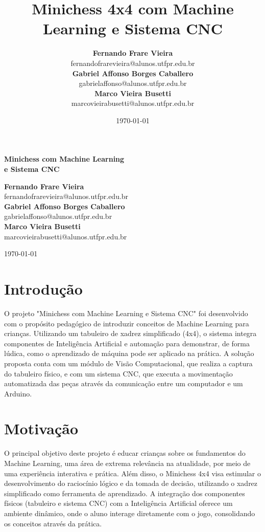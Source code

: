 \documentclass[a4paper,12pt]{article}
\title{\textbf{Minichess 4x4 com Machine Learning e Sistema CNC}}
\author{%
    \textbf{Fernando Frare Vieira} \\
    fernandofrarevieira@alunos.utfpr.edu.br \\[1.5em]
    \textbf{Gabriel Affonso Borges Caballero} \\
    gabrielaffonso@alunos.utfpr.edu.br \\[1.5em]
    \textbf{Marco Vieira Busetti} \\
    marcovieirabusetti@alunos.utfpr.edu.br
}
\date{\today}
\begin{document}
\vspace{1em}

\begin{center}
    \Large\textbf{Minichess com Machine Learning \\e Sistema CNC}
\end{center}

\vspace{1em}

\begin{center}
    \textbf{Fernando Frare Vieira} \\
    fernandofrarevieira@alunos.utfpr.edu.br \\[1.5em]
    \textbf{Gabriel Affonso Borges Caballero} \\
    gabrielaffonso@alunos.utfpr.edu.br \\[1.5em]
    \textbf{Marco Vieira Busetti} \\
    marcovieirabusetti@alunos.utfpr.edu.br
\end{center}

\vspace{2em}

\begin{center}
    \today
\end{center}

\vspace{2em}

\section{Introdução}
O projeto "Minichess com Machine Learning e Sistema CNC" \;foi desenvolvido com o propósito pedagógico de introduzir conceitos de Machine Learning para crianças. Utilizando um tabuleiro de xadrez simplificado (4x4), o sistema integra componentes de Inteligência Artificial e automação para demonstrar, de forma lúdica, como o aprendizado de máquina pode ser aplicado na prática. A solução proposta conta com um módulo de Visão Computacional, que realiza a captura do tabuleiro físico, e com um sistema CNC, que executa a movimentação automatizada das peças através da comunicação entre um computador e um Arduino.

\section{Motivação}
O principal objetivo deste projeto é educar crianças sobre os fundamentos do Machine Learning, uma área de extrema relevância na atualidade, por meio de uma experiência interativa e prática. Além disso, o Minichess 4x4 visa estimular o desenvolvimento do raciocínio lógico e da tomada de decisão, utilizando o xadrez simplificado como ferramenta de aprendizado. A integração dos componentes físicos (tabuleiro e sistema CNC) com a Inteligência Artificial oferece um ambiente dinâmico, onde o aluno interage diretamente com o jogo, consolidando os conceitos através da prática.
\end{document}
